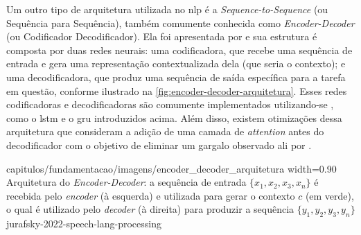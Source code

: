 


Um outro tipo de arquitetura utilizada no \acrshort{nlp} é a \textit{Sequence-to-Sequence} (ou Sequência para Sequência), também comumente conhecida como \textit{Encoder-Decoder} (ou Codificador Decodificador). Ela foi apresentada por  e sua estrutura é composta por duas redes neurais: uma codificadora, que recebe uma sequência de entrada e gera uma representação contextualizada dela (que seria o contexto); e uma decodificadora, que produz uma sequência de saída específica para a tarefa em questão, conforme ilustrado na \autoref{fig:encoder-decoder-arquitetura}. 
Esses redes codificadoras e decodificadoras são comumente implementados utilizando-se , como o \acrshort{lstm} e o \acrshort{gru} introduzidos acima. Além disso, existem otimizações dessa arquitetura que consideram a adição de uma camada de \textit{attention} antes do decodificador com o objetivo de eliminar um gargalo observado ali por .

{capitulos/fundamentacao/imagens/encoder_decoder_arquitetura}
{width=0.90\textwidth}
{Arquitetura do \textit{Encoder-Decoder}: a sequência de entrada \(\{x_1, x_2, x_3, x_n\}\) é recebida pelo \textit{encoder} (à esquerda) e utilizada para gerar o contexto \(c\) (em verde), o qual é utilizado pelo \textit{decoder} (à direita) para produzir a sequência \(\{y_1, y_2, y_3, y_n\}\)}
{jurafsky-2022-speech-lang-processing}





